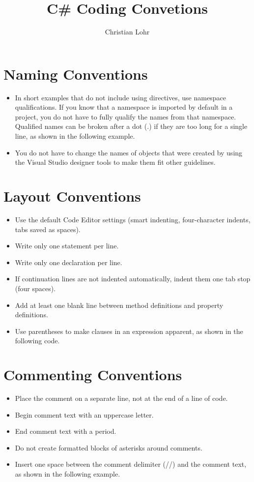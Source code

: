 \documentclass[11pt]{article}
\title{C\# Coding Convetions}
\author{Christian Lohr}
\newcommand{\changefont}[3]{
\fontfamily{#1} \fontseries{#2} \fontshape{#3} \selectfont}
\begin{document}
\changefont{cmss}{m}{n}
\maketitle
\lstset{style=sharpc}
\section{Naming Conventions}
\begin{itemize}
  \item In short examples that do not include using directives, use namespace qualifications. If you know that a namespace is imported by default in a project, you do not have to fully qualify the names from that namespace. Qualified names can be broken after a dot (.) if they are too long for a single line, as shown in the following example.
  \item You do not have to change the names of objects that were created by using the Visual Studio designer tools to make them fit other guidelines.
\end{itemize}

\section{Layout Conventions}
\begin{itemize}
  \item Use the default Code Editor settings (smart indenting, four-character indents, tabs saved as spaces).
  \item Write only one statement per line.
  \item Write only one declaration per line.
  \item If continuation lines are not indented automatically, indent them one tab stop (four spaces).
  \item Add at least one blank line between method definitions and property definitions.
  \item Use parentheses to make clauses in an expression apparent, as shown in the following code.
\end{itemize}

\section{Commenting Conventions}
\begin{itemize}
  \item Place the comment on a separate line, not at the end of a line of code.
  \item Begin comment text with an uppercase letter.
  \item End comment text with a period.
  \item Do not create formatted blocks of asterisks around comments.
  \item Insert one space between the comment delimiter (//) and the comment text, as shown in the following example.
\end{itemize}

\end{document}
